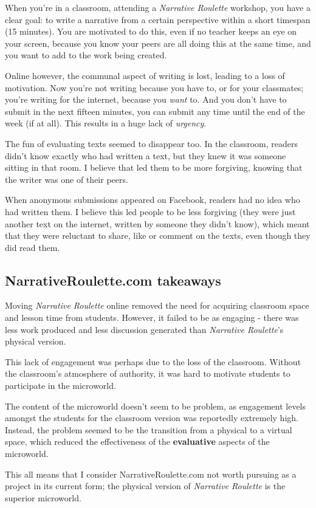When you're in a classroom, attending a \emph{Narrative Roulette}
workshop, you have a clear goal: to write a narrative from a certain
perspective within a short timespan (15 minutes). You are motivated to
do this, even if no teacher keeps an eye on your screen, because you
know your peers are all doing this at the same time, and you want to add
to the work being created.

Online however, the communal aspect of writing is lost, leading to a loss of motivation. Now you're not writing because you have
to, or for your classmates; you're writing for the internet, because you
\emph{want} to. And you don't have to submit in the next fifteen
minutes, you can submit any time until the end of the week (if at all). This results in a huge lack of \emph{urgency}. 

The fun of evaluating texts seemed to disappear too. In the classroom,
readers didn't know exactly who had written a text, but they knew it was
someone sitting in that room. I believe that led them to be more
forgiving, knowing that the writer was one of their peers.

When anonymous submissions appeared on Facebook, readers had no idea
who had written them. I believe this led people to be less forgiving (they were just another text on the internet, written by someone they didn't know), which
meant that they were reluctant to share, like or comment on the texts, even though they did read them.

\subsection{NarrativeRoulette.com takeaways}

Moving \emph{Narrative Roulette} online removed the need for acquiring
classroom space and lesson time from students. However, it failed to be
as engaging - there was less work produced and less discussion generated
than \emph{Narrative Roulette}'s physical version.

This lack of engagement was perhaps due to the loss of the classroom.
Without the classroom's atmosphere of authority, it was hard to motivate
students to participate in the microworld.

The content of the microworld doesn't seem to be problem, as engagement
levels amongst the students for the classroom version was reportedly
extremely high\cite{ingulfson}. Instead, the problem seemed to be the
transition from a physical to a virtual space, which reduced the effectiveness of the
\textbf{evaluative} aspects of the microworld.

This all means that I consider NarrativeRoulette.com not worth pursuing as a
project in its current form; the physical version of \emph{Narrative
Roulette} is the superior microworld.
